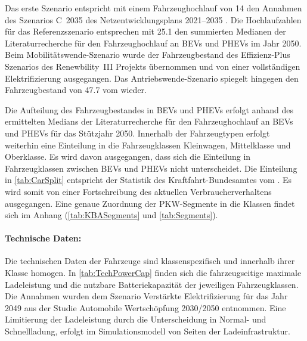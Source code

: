 Das erste Szenario entspricht mit einem Fahrzeughochlauf von \SI{14}{\MioStk} den Annahmen des Szenarios C~\num{2035} des Netzentwicklungsplans \numrange[range-phrase=~{--}~]{2021}{2035} \cite{BNetzA2020}.
Die Hochlaufzahlen für das Referenzszenario entsprechen mit \SI{25.1}{\MioStk} den summierten Medianen der Literaturrecherche für den Fahrzeughochlauf an \glspl{BEV} und \glspl{PHEV} im Jahr \num{2050}.
Beim Mobilitätswende-Szenario wurde der Fahrzeugbestand des Effizienz-Plus Szenarios des Renewbility~III Projekts \cite{Institut2016} übernommen und von einer vollständigen Elektrifizierung ausgegangen.
Das Antriebswende-Szenario spiegelt hingegen den Fahrzeugbestand von \SI{47.7}{\MioStk} vom  \cite{KBA2020} wieder.



Die Aufteilung des Fahrzeugbestandes in \glspl{BEV} und \glspl{PHEV} erfolgt anhand des ermittelten Medians der Literaturrecherche für den Fahrzeughochlauf an \glspl{BEV} und \glspl{PHEV} für das Stützjahr \num{2050}.
Innerhalb der Fahrzeugtypen erfolgt weiterhin eine Einteilung in die Fahrzeugklassen Kleinwagen, Mittelklasse und Oberklasse.
Es wird davon ausgegangen, dass sich die Einteilung in Fahrzeugklassen zwischen \glspl{BEV} und \glspl{PHEV} nicht unterscheidet.
Die Einteilung in \autoref{tab:CarSplit} entspricht der Statistik des Kraftfahrt-Bundesamtes \cite{KBASegments2020} vom .
Es wird somit von einer Fortschreibung des aktuellen Verbraucherverhaltens ausgegangen.
Eine genaue Zuordnung der \gls{PKW}-Segmente in die Klassen findet sich im Anhang (\autoref{tab:KBASegments} und \autoref{tab:Segments}).




\paragraph{Technische Daten:}

Die technischen Daten der Fahrzeuge sind klassenspezifisch und innerhalb ihrer Klasse homogen.
In \autoref{tab:TechPowerCap} finden sich die fahrzeugseitige maximale Ladeleistung und die nutzbare Batteriekapazität der jeweiligen Fahrzeugklassen.
Die Annahmen wurden dem Szenario \glqq Verstärkte Elektrifizierung\grqq{} für das Jahr \num{2049} aus der Studie Automobile Wertschöpfung \num{2030}/\num{2050} \cite{Kaul2019} entnommen.
Eine Limitierung der Ladeleistung durch die Unterscheidung in Normal- und Schnellladung, erfolgt im Simulationsmodell von Seiten der Ladeinfrastruktur.

